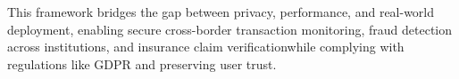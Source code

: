 \documentclass[12pt,a4paper]{report}
\theoremstyle{plain}
\theoremstyle{definition}
\theoremstyle{remark}
\begin{document}
This framework bridges the gap between privacy, performance, and real-world deployment, enabling secure cross-border transaction monitoring, fraud detection across institutions, and insurance claim verification\textemdash while complying with regulations like GDPR and preserving user trust.

\clearpage

\tableofcontents
\clearpage

\listoffigures
\clearpage
\listoftables
\clearpage

\setcounter{page}{1}








\nocite{*}


\end{document}
